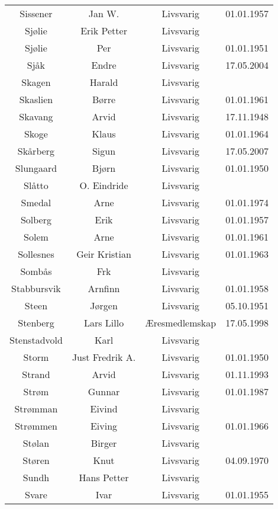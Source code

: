 \begin{tabular}{cccc}
        Sissener	&	Jan W.	&	Livsvarig 	&	01.01.1957	\\
        Sjølie	&	Erik Petter	&	Livsvarig 	&		\\
        Sjølie	&	Per	&	Livsvarig 	&	01.01.1951	\\
        Sjåk 	&	Endre	&	Livsvarig	&	17.05.2004	\\
        Skagen	&	Harald	&	Livsvarig 	&		\\
        Skaslien	&	Børre	&	Livsvarig 	&	01.01.1961	\\
        Skavang	&	Arvid	&	Livsvarig 	&	17.11.1948	\\
        Skoge	&	Klaus	&	Livsvarig 	&	01.01.1964	\\
        Skårberg	&	Sigun	&	Livsvarig	&	17.05.2007	\\
        Slungaard	&	Bjørn	&	Livsvarig 	&	01.01.1950	\\
        Slåtto	&	O. Eindride	&	Livsvarig 	&		\\
        Smedal	&	Arne	&	Livsvarig 	&	01.01.1974	\\
        Solberg	&	Erik	&	Livsvarig 	&	01.01.1957	\\
        Solem	&	Arne	&	Livsvarig 	&	01.01.1961	\\
        Sollesnes	&	Geir Kristian	&	Livsvarig 	&	01.01.1963	\\
        Sombås	&	Frk	&	Livsvarig 	&		\\
        Stabbursvik	&	Arnfinn	&	Livsvarig 	&	01.01.1958	\\
        Steen	&	Jørgen	&	Livsvarig 	&	05.10.1951	\\
        Stenberg 	&	Lars Lillo 	&	Æresmedlemskap	&	17.05.1998	\\
        Stenstadvold	&	Karl	&	Livsvarig 	&		\\
        Storm	&	Just Fredrik A.	&	Livsvarig 	&	01.01.1950	\\
        Strand	&	Arvid	&	Livsvarig 	&	01.11.1993	\\
        Strøm	&	Gunnar	&	Livsvarig 	&	01.01.1987	\\
        Strømman	&	Eivind	&	Livsvarig 	&		\\
        Strømmen	&	Eiving	&	Livsvarig 	&	01.01.1966	\\
        Stølan	&	Birger	&	Livsvarig 	&		\\
        Støren	&	Knut	&	Livsvarig 	&	04.09.1970	\\
        Sundh	&	Hans Petter	&	Livsvarig 	&		\\
        Svare	&	Ivar	&	Livsvarig 	&	01.01.1955	\\

\end{tabular}
